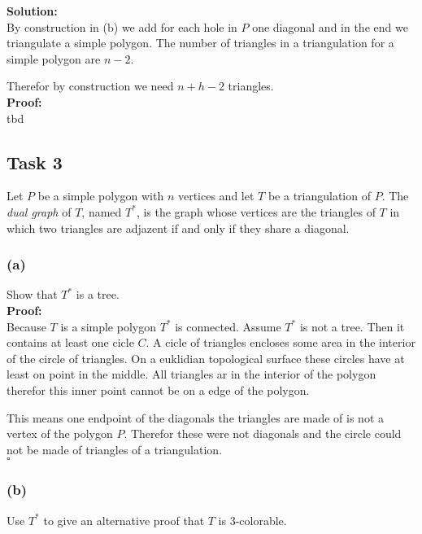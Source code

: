 \documentclass[11pt,a4paper,ngerman]{article}
\begin{document}
\textbf{Solution:}\\

By construction in (b) we add for each hole in $P$ one diagonal and in the end we triangulate a simple polygon.
The number of triangles in a triangulation for a simple polygon are $n-2$.

Therefor by construction we need $n + h -2$ triangles.\\

\textbf{Proof:}\\
tbd

\subsection*{Task 3}

Let $P$ be a simple polygon with $n$ vertices and let $T$ be a triangulation of $P$. The \emph{dual graph} of $T$,
named $T^*$, is the graph whose vertices are the triangles of $T$ in which two triangles are adjazent if and only if
they share a diagonal.

\subsubsection*{(a)}
Show that $T^*$ is a tree.\\

\textbf{Proof:}\\

Because $T$ is a simple polygon $T^*$ is connected. Assume $T^*$ is not a tree. Then it contains at least one
cicle $C$. A cicle of triangles encloses some area in the interior of the circle of triangles. On a euklidian
topological surface these circles have at least on point in the middle. All triangles ar in the interior of the polygon
therefor this inner point cannot be on a edge of the polygon.

This means one endpoint of the diagonals the triangles are made of is not a vertex of the polygon $P$. Therefor these
were not diagonals and the circle could not be made of triangles of a triangulation.\\
\mbox{}\hfill$\square$

\subsubsection*{(b)}

Use $T^*$ to give an alternative proof that $T$ is 3-colorable.\\
\end{document}
